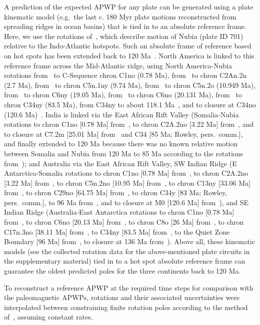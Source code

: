 A prediction of the expected APWP for any plate can be generated using a plate
kinematic model (e.g.\ the last c. 180 Myr plate motions
reconstructed from spreading ridges in ocean basins) that is tied in to an
absolute reference frame. Here, we use the rotations of~\cite{O05}, which
describe motion of Nubia (plate ID 701) relative to the Indo-Atlantic hotspots.
Such an absolute frame of reference based on hot spots has been extended back to
120 Ma~\cite{O05}. North America is linked to this reference frame across the
Mid-Atlantic ridge, using North America-Nubia rotations from~\cite{D10} to
C-Sequence chron C1no (0.78 Ma), from~\cite{S12} to chron C2An.2n (2.7 Ma),
from~\cite{M99} to chron C5n.1ny (9.74 Ma), from~\cite{G13} to chron C5n.2o
(10.949 Ma), from~\cite{M99} to chron C6ny (19.05 Ma), from~\cite{G13} to chron
C6no (20.131 Ma), from~\cite{M99} to chron C34ny (83.5 Ma), from C34ny to about
118.1 Ma~\cite{S12}, and to closure at C34no (120.6 Ma)~\cite{G13}. India is
linked via the East African Rift Valley (Somalia-Nubia rotations to chron C1no
[0.78 Ma] from~\cite{D17}, to chron C2A.2no [3.22 Ma] from~\cite{H05}, and to
closure at C7.2m [25.01 Ma] from~\cite{R16} and C34 [85 Ma; Rowley, pers.\
comm.], and finally extended to 120 Ma because there was no known relative
motion between Somalia and Nubia from 120 Ma to 85 Ma according to the rotations
from~\cite{M16}); and Australia via the East African Rift Valley, SW Indian
Ridge (E Antarctica-Somalia rotations to chron C1no [0.78 Ma] from~\cite{D17},
to chron C2A.2no [3.22 Ma] from~\cite{H05}, to chron C5n.2no [10.95 Ma]
from~\cite{L02}, to chron C13ny [33.06 Ma] from~\cite{P08}, to chron C29no
[64.75 Ma] from~\cite{C10}, to chron C34y [83 Ma; Rowley, pers.\ comm.], to 96
Ma from~\cite{M01}, and to closure at M0 [120.6 Ma] from~\cite{M08}), and SE
Indian Ridge (Australia-East Antarctica rotations to chron C1no [0.78 Ma]
from~\cite{D17}, to chron C6no [20.13 Ma] from~\cite{C04}, to chron C8o [26 Ma]
from~\cite{G18}, to chron C17n.3no [38.11 Ma] from~\cite{C04}, to C34ny [83.5
Ma] from~\cite{Wh13}, to the Quiet Zone Boundary [96 Ma] from~\cite{W07}, to
closure at 136 Ma from~\cite{Wh13}). Above all, these kinematic models (see the
collected rotation data for the above-mentioned plate circuits in the
supplementary material) tied in to a hot spot absolute reference frame can
guarantee the oldest predicted poles for the three continents back to 120 Ma.

To reconstruct a reference APWP at the required time steps for comparison with
the paleomagnetic APWPs, rotations and their associated uncertainties were
interpolated between constraining finite rotation poles according to the method
of~\cite{D08}, assuming constant rates.

